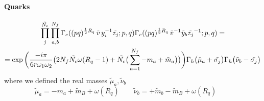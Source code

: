 \paragraph{Quarks}
\begin{multline}
 \prod_{ j }^{\tilde{N_c}} \prod_{ a,b }^{N_f}  \Gamma_e ( (pq)^{{1 \over 2 } R_q} \, \tilde{v} \, y_i^{-1} \tilde{z_j} ; p,q)\Gamma_e ( (pq)^{{1 \over 2 } R_q} \, \tilde{v}^{-1} \tilde y_b \tilde{z_j}^{-1} ; p,q)  = \\
  =   \exp \bigg( \frac{- i \pi }{6 r \omega_1 \omega_2} \big( 2  N_f \tilde{N_c}\omega (R_q - 1 ) +  \tilde{N_c} \big( \sum_{a=1}^{N_f} - m_a + \tilde{m}_a \big)  \big) \bigg)  \Gamma_h \big(\tilde{ \mu}_a + \tilde{\sigma_j} \big) \Gamma_h \big( \tilde{\nu}_b - \tilde{\sigma_j} \big)
\end{multline}
where we defined the real masses $\tilde{\mu}_a,\tilde{\nu}_b$
\begin{equation}
\tilde{\mu}_a = - m_a + \tilde{m}_B + \omega (R_q) \qquad 
\tilde{\nu}_b = + \tilde{m}_b - \tilde{m}_B + \omega (R_q) \qquad 
\end{equation}



\paragraph{}




